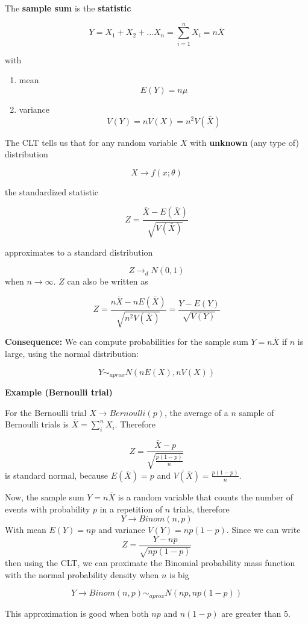 \documentclass[
]{book}
\providecommand{\tightlist}{%
  \setlength{\itemsep}{0pt}\setlength{\parskip}{0pt}}
\begin{document}
The \textbf{sample sum} is the \textbf{statistic}

\[Y=X_1+X_2+...X_n=\sum_{i=1}^n X_i=n \bar{X}\]

with

\begin{enumerate}
\def\labelenumi{\arabic{enumi})}
\tightlist
\item
  mean \[E(Y)=n\mu\]
\item
  variance \[V(Y)=nV(X)=n^2V(\bar{X})\]
\end{enumerate}

The CLT tells us that for any random variable \(X\) with \textbf{unknown} (any type of) distribution

\[X \rightarrow f(x; \theta)\]

the standardized statistic

\[Z=\frac{\bar{X}-E(\bar{X})}{\sqrt{V(\bar{X})}}\]

approximates to a standard distribution

\[Z \rightarrow_d N(0,1)\] when \(n\rightarrow \infty\). \(Z\) can also be written as

\[Z=\frac{n\bar{X}-nE(\bar{X})}{\sqrt{n^2V(\bar{X})}}=\frac{Y-E(Y)}{\sqrt{V(Y)}}\]

\textbf{Consequence:} We can compute probabilities for the sample sum \(Y=n\bar{X}\) if \(n\) is large, using the normal distribution:

\[Y \sim_{aprox}  N(nE(X), nV(X))\]

\textbf{Example (Bernoulli trial)}

For the Bernoulli trial \(X \rightarrow Bernoulli(p)\), the average of a \(n\) sample of Bernoulli trials is \(\bar{X}=\sum_i^n X_i\). Therefore

\[Z=\frac{\bar{X}-p}{\sqrt{\frac{p(1-p)}{n}}}\]
is standard normal, because \(E(\bar{X})=p\) and \(V(\bar{X})=\frac{p(1-p)}{n}\).

Now, the sample sum \(Y=n\bar{X}\) is a random variable that counts the number of events with probability \(p\) in a repetition of \(n\) trials, therefore
\[Y \rightarrow Binom(n, p)\]
With mean \(E(Y)=np\) and variance \(V(Y)=np(1-p)\). Since we can write
\[Z=\frac{Y-np}{\sqrt{np(1-p)}}\]
then using the CLT, we can proximate the Binomial probability mass function with the normal probability density when \(n\) is big

\[Y \rightarrow  Binom(n, p) \sim_{aprox}  N(np, np(1-p))\]

This approximation is good when both \(np\) and \(n(1-p)\) are greater than \(5\).
\end{document}
